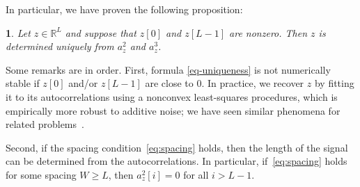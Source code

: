 \documentclass[english,11pt]{article}
\newcommand{\1}{\mathbf{1}}
\numberwithin{equation}{section}
\theoremstyle{plain}
\theoremstyle{definition}
\theoremstyle{remark}
\theoremstyle{plain}
\theoremstyle{remark}
\theoremstyle{plain}
\theoremstyle{plain}
\newtheorem{proposition}[thm]{\protect\propositionname}
\providecommand{\propositionname}{Proposition}
\newcommand{\RL}{\mathbb{R}^L}
\begin{document}
In particular, we have proven the following proposition:

\begin{proposition} \label{prop:uniqueness}
	Let $z\in\RL$ and suppose that $z[0]$ and $z[L-1]$ are nonzero. Then $z$ is determined uniquely from  $a_z^2$ and $a_z^3$.
\end{proposition}

Some remarks are in order. First, formula \eqref{eq-uniqueness} is not numerically stable if $z[0]$ and/or $z[L-1]$ are close to 0. In practice, we recover $z$ by fitting it to its autocorrelations using a nonconvex least-squares procedures, which is empirically more robust to additive noise; we have seen similar phenomena for related problems~\cite{bendory2017bispectrum,boumal2017heterogeneous}.

Second, if the spacing condition~\eqref{eq:spacing} holds, then the length of the signal can be determined from the autocorrelations.
In particular, if~\eqref{eq:spacing} holds for some spacing $W\geq L$, then $a_z^2[i]=0$ for all $i>L-1$.
\end{document}
